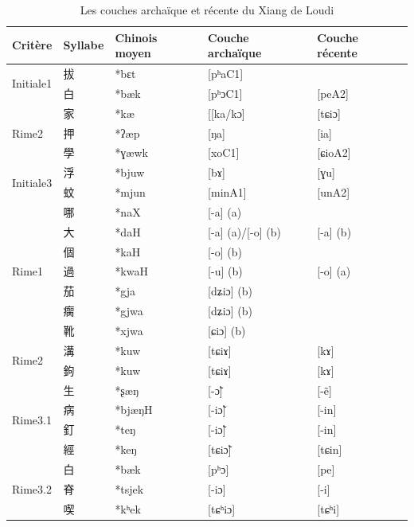 \documentclass{scrbook}
\newcounter{c}[subsubsection]
\newcommand{\difwenbai}{couches archaïque et récente\xspace}
\begin{document}
\begin{sloppypar}
\begin{table}[htbp]
  \centering
    \begin{tabular}{lllll}
    \toprule
    Critère & Syllabe & Chinois moyen  & Couche archaïque & Couche récente \\
    \midrule
    \multirow{2}[2]{*}{Initiale1} & 拔     & *bɛt  & [pʰaC1] &  \\
          & 白     & *bæk  & [pʰɔC1] & [peA2] \\
    \midrule
    \multirow{3}[2]{*}{Rime2} & 家     & *kæ   & [[ka/kɔ]   & [tɕiɔ] \\
          & 押     & *ʔæp  & [ŋa]  & [ia] \\
          & 學     & *ɣæwk & [xoC1] & [ɕioA2] \\
    \midrule
    \multirow{2}[2]{*}{Initiale3} & 浮     & *bjuw & [bɤ]  & [ɣu] \\
          & 蚊     & *mjun & [minA1] & [unA2] \\
    \midrule
    \multirow{7}[2]{*}{Rime1} & 哪     & *naX  & [-a] (a) &  \\
          & 大     & *daH  & [-a] (a)/[-o] (b) & [-a] (b)  \\
          & 個     & *kaH  & [-o] (b) &  \\
          & 過     & *kwaH & [-u] (b) & \multicolumn{1}{l}{[-o] (a)} \\
          & 茄     & *gja  & [dʑiɔ] (b) &  \\
          & 瘸     & *gjwa & [dʑiɔ] (b) &  \\
          & 靴     & *xjwa & [ɕiɔ] (b) &  \\
    \midrule
    \multirow{2}[2]{*}{Rime2} & 溝     & *kuw  & [tɕiɤ] & [kɤ] \\
          & 鉤     & *kuw  & [tɕiɤ] & [kɤ] \\
    \midrule
    \multirow{4}[2]{*}{Rime3.1} & 生     & *ʂæŋ  & [-ɔ̃] & [-ẽ] \\
          & 病     & *bjæŋH & [-iɔ̃] & [-in] \\
          & 釘     & *teŋ  & [-iɔ̃] & [-in] \\
          & 經     & *keŋ  & [tɕiɔ̃]  & [tɕin] \\
    \midrule
    \multirow{3}[2]{*}{Rime3.2} & 白     & *bæk  & [pʰɔ] & [pe] \\
          & 脊     & *tsjek & [-iɔ] & [-i] \\
          & 喫     & *kʰek & [tɕʰiɔ] & [tɕʰi] \\
    \bottomrule
    \end{tabular}%
  \caption{Les \difwenbai du Xiang de Loudi}
  \label{tab:Loudi1}%
\end{table}%


\end{sloppypar}
\end{document}
